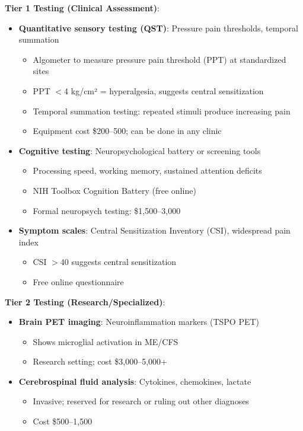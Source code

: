 \textbf{Tier 1 Testing (Clinical Assessment)}:
\begin{itemize}
    \item \textbf{Quantitative sensory testing (QST)}: Pressure pain thresholds, temporal summation
    \begin{itemize}
        \item Algometer to measure pressure pain threshold (PPT) at standardized sites
        \item PPT $<$4 kg/cm² = hyperalgesia, suggests central sensitization
        \item Temporal summation testing: repeated stimuli produce increasing pain
        \item Equipment cost \$200--500; can be done in any clinic
    \end{itemize}

    \item \textbf{Cognitive testing}: Neuropsychological battery or screening tools
    \begin{itemize}
        \item Processing speed, working memory, sustained attention deficits
        \item NIH Toolbox Cognition Battery (free online)
        \item Formal neuropsych testing: \$1,500--3,000
    \end{itemize}

    \item \textbf{Symptom scales}: Central Sensitization Inventory (CSI), widespread pain index
    \begin{itemize}
        \item CSI $>$40 suggests central sensitization
        \item Free online questionnaire
    \end{itemize}
\end{itemize}

\textbf{Tier 2 Testing (Research/Specialized)}:
\begin{itemize}
    \item \textbf{Brain PET imaging}: Neuroinflammation markers (TSPO PET)
    \begin{itemize}
        \item Shows microglial activation in ME/CFS~\cite{Nakatomi2014neuroinflammation}
        \item Research setting; cost \$3,000--5,000+
    \end{itemize}

    \item \textbf{Cerebrospinal fluid analysis}: Cytokines, chemokines, lactate
    \begin{itemize}
        \item Invasive; reserved for research or ruling out other diagnoses
        \item Cost \$500--1,500
    \end{itemize}
\end{itemize}

